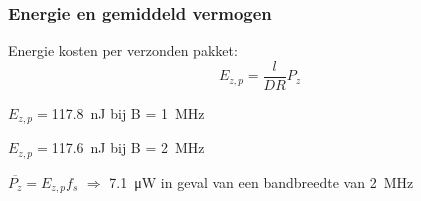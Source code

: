 \begin{frame}
    \frametitle{Energie en gemiddeld vermogen}

    Energie kosten per verzonden pakket:
    \begin{equation*}
        E_{z,p}=\frac{l}{DR}P_z
    \end{equation*}

    \pause

    $E_{z,p}=$\qty{117.8}{\nano\joule} bij B = \qty{1}{\mega\hertz}

    $E_{z,p}=$\qty{117.6}{\nano\joule} bij B = \qty{2}{\mega\hertz}

    \pause

    \vspace{1cm}
    $\overline{P_z}=E_{z,p}f_s$ $\Rightarrow$ \qty{7.1}{\micro\watt} in geval van een bandbreedte van \qty{2}{\mega\hertz}

\end{frame}